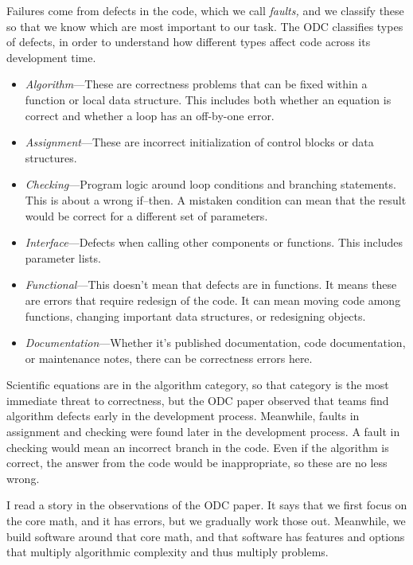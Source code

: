 \documentclass[fleqn,10pt]{olplainarticle}
\begin{document}
Failures come from defects in the code, which we call \emph{faults,}
and we classify these so that we know which are most important
to our task. The ODC classifies types of defects, in order to understand
how different types affect code across its development time.
\begin{itemize}
    \item \emph{Algorithm}---These are correctness problems
    that can be fixed within a function or local data structure.
    This includes both whether an equation is correct and whether
    a loop has an off-by-one error.

    \item \emph{Assignment}---These are incorrect initialization
    of control blocks or data structures.

    \item \emph{Checking}---Program logic around loop conditions
    and branching statements. This is about a wrong if--then. A mistaken condition can mean that
    the result would be correct for a different set of parameters.

    \item \emph{Interface}---Defects when calling other components
    or functions. This includes parameter lists.

    \item \emph{Functional}---This doesn't mean that defects are
    in functions. It means these are errors that require redesign
    of the code. It can mean moving code among functions, changing
    important data structures, or redesigning objects.

    \item \emph{Documentation}---Whether it's published documentation,
    code documentation, or maintenance notes, there can be
    correctness errors here.
\end{itemize}
Scientific equations are in the algorithm category, so that category
is the most immediate threat to correctness, but the
ODC paper observed that teams find algorithm defects early in the
development process. Meanwhile, faults in assignment and checking were
found later in the development process. A fault in checking would
mean an incorrect branch in the code. Even if the algorithm is
correct, the answer from the code would be inappropriate, so these
are no less wrong.

I read a story in the observations of the ODC paper. It says
that we first focus on the core math, and it has errors, but we
gradually work those out. Meanwhile, we build software around that
core math, and that software has features and options that multiply
algorithmic complexity and thus multiply problems.
\end{document}
